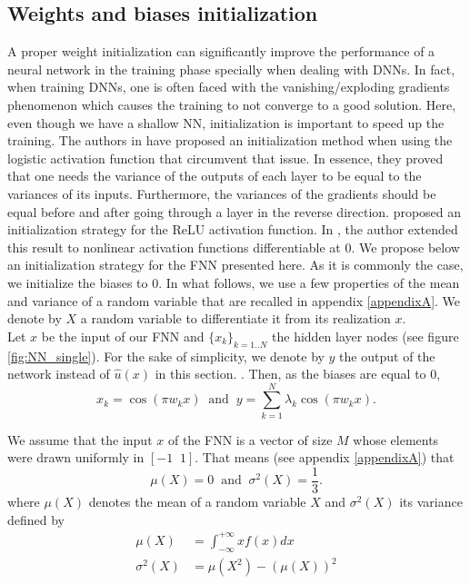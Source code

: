 \documentclass[AMS,STIX1COL]{WileyNJD-v2}
\begin{document}
\subsection{Weights and biases initialization}\label{subsec:weightsini}
A proper weight initialization can significantly improve the performance of a neural network in the training phase specially when dealing with DNNs. In fact, when training DNNs, one is often faced with the vanishing/exploding gradients phenomenon \cite{Geron2017} which causes the training to not converge to a good solution. Here, even though we have a shallow NN, initialization is important to speed up the training. The authors in \cite{Glorot2010} have proposed an initialization method when using the logistic activation function that circumvent that issue. In essence, they proved that one needs the variance of the outputs of each layer to be equal to the variances of its inputs. Furthermore, the variances of the gradients should be equal before and after going through a layer in the reverse direction. \cite{Heinit2015} proposed an initialization strategy for the ReLU activation function. In \cite{Kumar2017}, the author extended this result to nonlinear activation functions differentiable at $0$. We propose below an initialization strategy for the FNN presented here. As it is commonly the case, we initialize the biases to $0$. In what follows, we use a few properties of the mean and variance of a random variable that are recalled in appendix \ref{appendixA}. We denote by $X$ a random variable to differentiate it from its realization $x$. \\
Let $x$ be the input of our FNN and $\{x_k\}_{k = 1..N}$ the hidden layer nodes (see figure \ref{fig:NN_single}). For the sake of simplicity, we denote by $y$ the output of the network instead of $\hat{u}(x)$ in this section. . Then, as the biases are equal to $0$,
$$
x_k = \cos(\pi w_k x ) \;\; \text{and}\;\; y = \sum_{k = 1}^N \lambda_k \cos(\pi w_k x). 
$$

 We assume that the input $x$ of the FNN is a vector of size $M$ whose elements were drawn uniformly in $[-1 \;\; 1]$. That means (see appendix \ref{appendixA}) that $$\mu(X) = 0  \;\; \text{and}\;\; \sigma^2(X) = \frac{1}{3}. $$ where $\mu(X)$ denotes the mean of a random variable $X$ and $\sigma^2(X)$ its variance defined by
 \begin{align*}
     \mu(X) &= \int_{-\infty}^{+\infty} xf(x) dx \\
     \sigma^2(X) &= \mu(X^2) - \left(\mu(X)\right)^2
 \end{align*}
\end{document}
